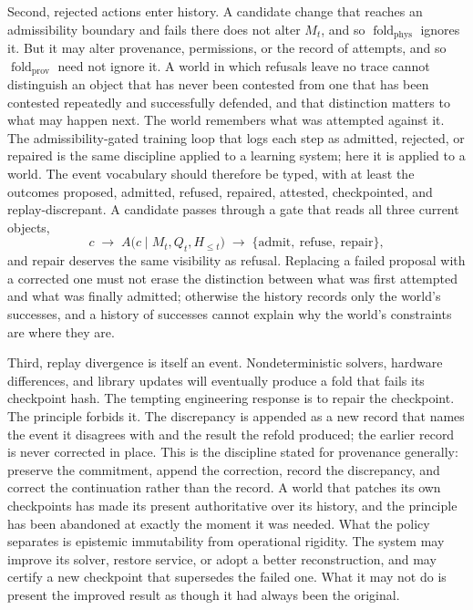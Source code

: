\documentclass[11pt]{article}
\DeclareMathOperator{\fold}{fold}
\begin{document}
Second, rejected actions enter history. A candidate change that reaches an admissibility boundary and fails there does not alter $M_t$, and so $\fold_{\mathrm{phys}}$ ignores it. But it may alter provenance, permissions, or the record of attempts, and so $\fold_{\mathrm{prov}}$ need not ignore it. A world in which refusals leave no trace cannot distinguish an object that has never been contested from one that has been contested repeatedly and successfully defended, and that distinction matters to what may happen next. The world remembers what was attempted against it. The admissibility-gated training loop that logs each step as admitted, rejected, or repaired is the same discipline applied to a learning system; here it is applied to a world. The event vocabulary should therefore be typed, with at least the outcomes proposed, admitted, refused, repaired, attested, checkpointed, and replay-discrepant. A candidate passes through a gate that reads all three current objects,
\[
c \;\longrightarrow\; A\bigl(c \mid M_t, Q_t, H_{\leq t}\bigr) \;\longrightarrow\; \{\text{admit},\ \text{refuse},\ \text{repair}\},
\]
and repair deserves the same visibility as refusal. Replacing a failed proposal with a corrected one must not erase the distinction between what was first attempted and what was finally admitted; otherwise the history records only the world's successes, and a history of successes cannot explain why the world's constraints are where they are.

Third, replay divergence is itself an event. Nondeterministic solvers, hardware differences, and library updates will eventually produce a fold that fails its checkpoint hash. The tempting engineering response is to repair the checkpoint. The principle forbids it. The discrepancy is appended as a new record that names the event it disagrees with and the result the refold produced; the earlier record is never corrected in place. This is the discipline stated for provenance generally: preserve the commitment, append the correction, record the discrepancy, and correct the continuation rather than the record. A world that patches its own checkpoints has made its present authoritative over its history, and the principle has been abandoned at exactly the moment it was needed. What the policy separates is epistemic immutability from operational rigidity. The system may improve its solver, restore service, or adopt a better reconstruction, and may certify a new checkpoint that supersedes the failed one. What it may not do is present the improved result as though it had always been the original.
\end{document}
